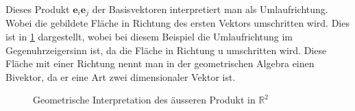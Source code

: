 Dieses Produkt $\textbf{e}_i\textbf{e}_j$ der Basisvektoren interpretiert man als Umlaufrichtung.
Wobei die gebildete Fläche in Richtung des ersten Vektors umschritten wird. 
Dies ist in \ref{figure:wedge} dargestellt, wobei bei diesem Beispiel die Umlaufrichtung im Gegenuhrzeigersinn ist, da die Fläche in Richtung u umschritten wird. 
Diese Fläche mit einer Richtung nennt man in der geometrischen Algebra einen Bivektor, da er eine Art zwei dimensionaler Vektor ist. 
\begin{figure}
\centering
{}
\caption{Geometrische Interpretation des äusseren Produkt in $\mathbb{R}^2$\label{figure:wedge}}
\end{figure}